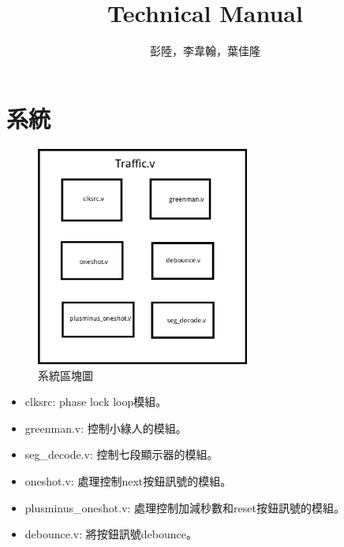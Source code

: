 \documentclass[11pt,a4paper]{article}
\title{Technical Manual}
\author{彭陸，李韋翰，葉佳隆}
\date{}
\begin{document}
\maketitle

\section{系統}
\begin{figure}[H]
  \centering
  \includegraphics[width=7cm]{block}
  \caption{系統區塊圖}
\end{figure}
\begin{itemize}
\item clksrc: phase lock loop模組。
\item greenman.v: 控制小綠人的模組。
\item seg\_decode.v: 控制七段顯示器的模組。
\item oneshot.v: 處理控制next按鈕訊號的模組。
\item plusminus\_oneshot.v: 處理控制加減秒數和reset按鈕訊號的模組。
\item debounce.v: 將按鈕訊號debounce。
\end{itemize}
\end{document}
